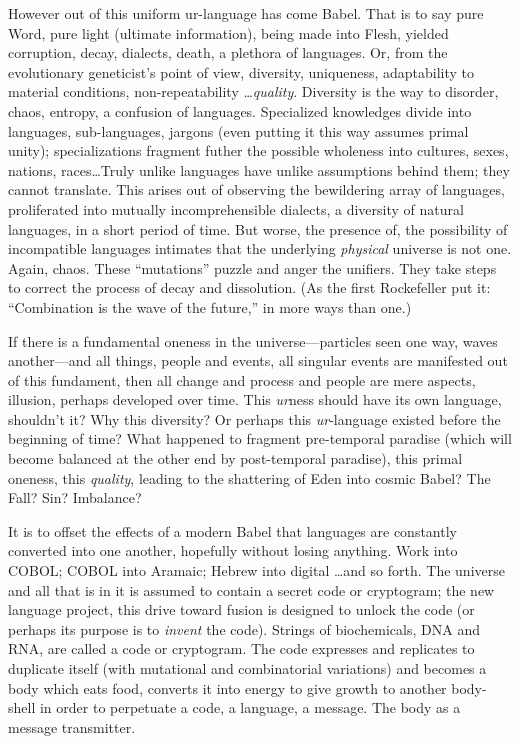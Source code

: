 However out of this uniform ur-language has come Babel. That is to say pure Word, pure light (ultimate information), being made into Flesh, yielded corruption, decay, dialects, death, a plethora of languages. Or, from the evolutionary geneticist's point of view, diversity, uniqueness, adaptability to material conditions, non-repeatability \ldots \emph{quality}. Diversity is the way to disorder, chaos, entropy, a confusion of languages. Specialized knowledges divide into languages, sub-languages, jargons (even putting it this way assumes primal unity); specializations fragment futher the possible wholeness into cultures, sexes, nations, races\ldots Truly unlike languages have unlike assumptions behind them; they cannot translate. This arises out of observing the bewildering array of languages, proliferated into mutually incomprehensible dialects, a diversity of natural languages, in a short period of time. But worse, the presence of, the possibility of incompatible languages intimates that the underlying \emph{physical} universe is not one. Again, chaos. These \enquote{mutations} puzzle and anger the unifiers. They take steps to correct the process of decay and dissolution. (As the first Rockefeller put it: \enquote{Combination is the wave of the future,} in more ways than one.)

If there is a fundamental oneness in the universe---particles seen one way, waves another---and all things, people and events, all singular events are manifested out of this fundament, then all change and process and people are mere aspects, illusion, perhaps developed over time. This \emph{ur}ness should have its own language, shouldn't it? Why this diversity? Or perhaps this \emph{ur}-language existed before the beginning of time? What happened to fragment pre-temporal paradise (which will become balanced at the other end by post-temporal paradise), this primal oneness, this \emph{quality}, leading to the shattering of Eden into cosmic Babel? The Fall? Sin? Imbalance?

It is to offset the effects of a modern Babel that languages are constantly converted into one another, hopefully without losing anything. Work into COBOL; COBOL into Aramaic; Hebrew into digital \ldots and so forth. The universe and all that is in it is assumed to contain a secret code or cryptogram; the new language project, this drive toward fusion is designed to unlock the code (or perhaps its purpose is to \emph{invent} the code). Strings of biochemicals, DNA and RNA, are called a code or cryptogram. The code expresses and replicates to duplicate itself (with mutational and combinatorial variations) and becomes a body which eats food, converts it into energy to give growth to another body-shell in order to perpetuate a code, a language, a message. The body as a message transmitter.

